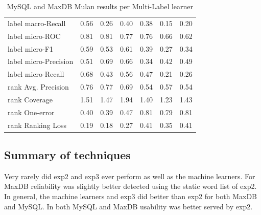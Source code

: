 \documentclass{acm_proc_article-sp}
\begin{document}
\begin{table}
\begin{tabular}{l|ccc|ccc}
label macro-Recall & 0.56 & 0.26 & 0.40 &         0.38  &  0.15  &  0.20 \\ 
                                                                            
label micro-ROC & 0.81 & 0.81 & 0.77 &            0.76  &  0.66  &  0.62 \\ 
                                                                            
label micro-F1 & 0.59 & 0.53 & 0.61 &             0.39  &  0.27  &  0.34 \\ 
                                                                            
label micro-Precision & 0.51 & 0.69 & 0.66 &      0.34  &  0.42  &  0.49 \\ 
                                                                            
label micro-Recall & 0.68 & 0.43 & 0.56 &         0.47  &  0.21  &  0.26 \\ 
      \hline                                                                      
rank Avg. Precision & 0.76 & 0.77 & 0.69 &          0.54  &  0.57  &  0.54 \\ 
                                                                            
rank Coverage & 1.51 & 1.47 & 1.94 &              1.40  &  1.23  &  1.43 \\ 
                                                                            
rank One-error & 0.40 & 0.39 & 0.47 &             0.81  &  0.79  &  0.81 \\ 
                                                                            
rank Ranking Loss & 0.19 & 0.18 & 0.27 &          0.41  &  0.35  &  0.41 \\ 
\hline
\end{tabular}
\caption{MySQL and MaxDB Mulan results per Multi-Label learner}
\label{tab:mulan}
\end{table}


\subsection{Summary of techniques}


Very rarely did exp2 and exp3 ever perform as well as the machine learners. For MaxDB reliability was slightly better detected using the static word list of \textsf{exp2}. In general, the machine learners and \textsf{exp3} did better than \textsf{exp2} for both MaxDB and MySQL. In both MySQL and MaxDB usability was better served by \textsf{exp2}.
\end{document}
